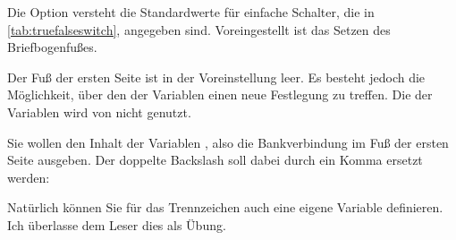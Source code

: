 Die Option versteht die Standardwerte für einfache Schalter, die in
\autoref{tab:truefalseswitch},  angegeben
sind. Voreingestellt ist das Setzen des
Briefbogenfußes.%
%
\EndIndexGroup


\begin{Declaration}
\end{Declaration}%
%
Der Fuß der ersten Seite ist in der Voreinstellung leer. Es besteht jedoch die
Möglichkeit, über den  der
Variablen  einen
neue Festlegung zu treffen. Die  der Variablen wird von
\KOMAScript{} nicht genutzt.

%
\begin{Example}
  Sie wollen den Inhalt der Variablen , also die
  Bankverbindung im Fuß der ersten Seite ausgeben. Der doppelte
  Backslash soll dabei durch ein Komma ersetzt werden:
\begin{lstcode}
\end{lstcode}
  Natürlich können Sie für das Trennzeichen auch eine eigene Variable
  definieren. Ich überlasse dem Leser dies als Übung.
  

\end{Example}
